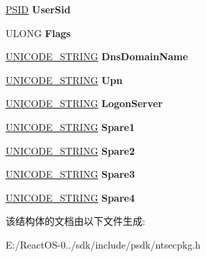 \begin{DoxyCompactItemize}
\hyperlink{struct___s_i_d}{P\+S\+ID} {\bfseries User\+Sid}
\item 
\mbox{\label{struct___s_e_c_p_k_g___p_r_i_m_a_r_y___c_r_e_d_ae3e55c06cd3125a5a602acd03cb685b6}} 
U\+L\+O\+NG {\bfseries Flags}
\item 
\mbox{\label{struct___s_e_c_p_k_g___p_r_i_m_a_r_y___c_r_e_d_a4c54c4190b5e9ccd727cd09831b35237}} 
\hyperlink{struct___u_n_i_c_o_d_e___s_t_r_i_n_g}{U\+N\+I\+C\+O\+D\+E\+\_\+\+S\+T\+R\+I\+NG} {\bfseries Dns\+Domain\+Name}
\item 
\mbox{\label{struct___s_e_c_p_k_g___p_r_i_m_a_r_y___c_r_e_d_ae96a57a3909f9833774afd3f6a10f6d0}} 
\hyperlink{struct___u_n_i_c_o_d_e___s_t_r_i_n_g}{U\+N\+I\+C\+O\+D\+E\+\_\+\+S\+T\+R\+I\+NG} {\bfseries Upn}
\item 
\mbox{\label{struct___s_e_c_p_k_g___p_r_i_m_a_r_y___c_r_e_d_a5e55485094c5b3ff3d06b90ffa666dff}} 
\hyperlink{struct___u_n_i_c_o_d_e___s_t_r_i_n_g}{U\+N\+I\+C\+O\+D\+E\+\_\+\+S\+T\+R\+I\+NG} {\bfseries Logon\+Server}
\item 
\mbox{\label{struct___s_e_c_p_k_g___p_r_i_m_a_r_y___c_r_e_d_a0f82e5e28d0a14881663bdca05067f42}} 
\hyperlink{struct___u_n_i_c_o_d_e___s_t_r_i_n_g}{U\+N\+I\+C\+O\+D\+E\+\_\+\+S\+T\+R\+I\+NG} {\bfseries Spare1}
\item 
\mbox{\label{struct___s_e_c_p_k_g___p_r_i_m_a_r_y___c_r_e_d_a96eab63dd655b06cfb76cf751352564c}} 
\hyperlink{struct___u_n_i_c_o_d_e___s_t_r_i_n_g}{U\+N\+I\+C\+O\+D\+E\+\_\+\+S\+T\+R\+I\+NG} {\bfseries Spare2}
\item 
\mbox{\label{struct___s_e_c_p_k_g___p_r_i_m_a_r_y___c_r_e_d_a674bbe610ac51a16ec0cb8d8b561e77b}} 
\hyperlink{struct___u_n_i_c_o_d_e___s_t_r_i_n_g}{U\+N\+I\+C\+O\+D\+E\+\_\+\+S\+T\+R\+I\+NG} {\bfseries Spare3}
\item 
\mbox{\label{struct___s_e_c_p_k_g___p_r_i_m_a_r_y___c_r_e_d_a06130af09fff1324287704dfe08e672a}} 
\hyperlink{struct___u_n_i_c_o_d_e___s_t_r_i_n_g}{U\+N\+I\+C\+O\+D\+E\+\_\+\+S\+T\+R\+I\+NG} {\bfseries Spare4}
\end{DoxyCompactItemize}


该结构体的文档由以下文件生成\+:\begin{DoxyCompactItemize}
\item 
E\+:/\+React\+O\+S-\/0../sdk/include/psdk/ntsecpkg.\+h\end{DoxyCompactItemize}
